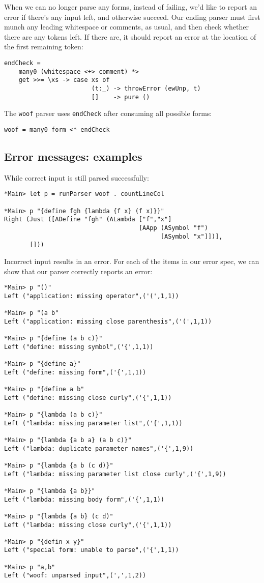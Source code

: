\documentclass{tmr}
\begin{document}
When we can no longer parse any forms, instead of failing, we'd like to report 
an error if there's any input left, and otherwise succeed.  Our ending parser
must first munch any leading whitespace or comments, as usual, and then check 
whether there are any tokens left.  If there are, it should report an error at 
the location of the first remaining token:
\begin{verbatim}
endCheck = 
    many0 (whitespace <+> comment) *>
    get >>= \xs -> case xs of
                        (t:_) -> throwError (ewUnp, t)
                        []    -> pure ()
\end{verbatim}
The \verb+woof+ parser uses \verb+endCheck+ after consuming all possible forms:
\begin{verbatim}
woof = many0 form <* endCheck
\end{verbatim}

\subsection{Error messages:  examples}
While correct input is still parsed successfully:
\begin{verbatim}
*Main> let p = runParser woof . countLineCol

*Main> p "{define fgh {lambda {f x} (f x)}}"
Right (Just ([ADefine "fgh" (ALambda ["f","x"] 
                                     [AApp (ASymbol "f") 
                                           [ASymbol "x"]])],
       []))
\end{verbatim}

Incorrect input results in an error.  For each of the items in our error spec, 
we can show that our parser correctly reports an error: 
\begin{verbatim}
*Main> p "()"
Left ("application: missing operator",('(',1,1))

*Main> p "(a b"
Left ("application: missing close parenthesis",('(',1,1))

*Main> p "{define (a b c)}"
Left ("define: missing symbol",('{',1,1))

*Main> p "{define a}"
Left ("define: missing form",('{',1,1))

*Main> p "{define a b"
Left ("define: missing close curly",('{',1,1))

*Main> p "{lambda (a b c)}"
Left ("lambda: missing parameter list",('{',1,1))

*Main> p "{lambda {a b a} (a b c)}"
Left ("lambda: duplicate parameter names",('{',1,9))

*Main> p "{lambda {a b (c d)}"
Left ("lambda: missing parameter list close curly",('{',1,9))

*Main> p "{lambda {a b}}"
Left ("lambda: missing body form",('{',1,1))

*Main> p "{lambda {a b} (c d)"
Left ("lambda: missing close curly",('{',1,1))

*Main> p "{defin x y}"
Left ("special form: unable to parse",('{',1,1))

*Main> p "a,b"
Left ("woof: unparsed input",(',',1,2))
\end{verbatim}
\end{document}
